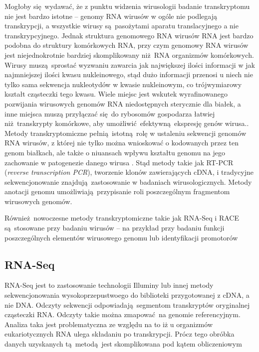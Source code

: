 \documentclass[two column, twoside, a4paper]{article}
\begin{document}
 Mogłoby się wydawać, że z punktu widzenia wirusologii badanie transkryptomu nie jest bardzo istotne -- genomy RNA wirusów w ogóle nie podlegają transkrypcji, a wszystkie wirusy są pasożytami aparatu translacyjnego a nie transkrypcyjnego. Jednak struktura genomowego RNA wirusów RNA jest bardzo podobna do struktury komórkowych RNA, przy czym genomowy RNA wirusów jest niejednokrotnie bardziej skomplikowany niż RNA organizmów komórkowych. Wirusy muszą sprostać wyzwaniu zawarcia jak największej ilości informacji w jak najmniejszej ilości kwasu nukleinowego, stąd dużo informacji przenosi u niech nie tylko sama sekwencja nukleotydów w kwasie nukleinowym, co trójwymiarowy kształt cząsteczki tego kwasu. Wiele miejsc jest wskutek wyrafinowanego pozwijania wirusowych genomów RNA niedostępnych sterycznie dla białek, a inne miejsca muszą przyłączać się do rybosomów gospodarza łatwiej niż transkrypty komórkowe, aby umożliwić efektywną ekspresję genów wirusa.. Metody transkryptomiczne pełnią istotną rolę w ustaleniu sekwencji genomów RNA wirusów, z której nie tylko można wnioskować o kodowanych przez ten genom białkach, ale także o niuansach wpływu kształtu genomu na jego zachowanie w patogenezie danego wirusa \autocite{Piekarowicz2013}. Stąd metody takie jak RT-PCR (\textit{reverse transcription PCR}), tworzenie klonów zawierających cDNA, i tradycyjne sekwencjonowanie znajdują zastosowanie w badaniach wirusologicznych. Metody anotacji genomu umożliwiają przypisanie roli poszczególnym fragmentom wirusowych genomów.

Również nowoczesne metody transkryptomiczne takie jak RNA-Seq i RACE są stosowane przy badaniu wirusów -- na przykład przy badaniu funkcji poszczególnych elementów wirusowego genomu lub identyfikacji promotorów \autocite{Steger2001}

\subsection{RNA-Seq}

RNA-Seq jest to zastosowanie technologii Illuminy lub innej metody sekwencjonowania wysokoprzepustwoego do biblioteki przygotowanej z cDNA, a nie DNA. Odczyty sekwencji odpowiadają segmentom transkryptów oryginalnej cząsteczki RNA. Odczyty takie można zmapować na genomie referencyjnym. Analiza taka jest problematyczna ze względu na to iż u organizmów eukariotycznych RNA ulega składaniu po transkrypcji. Prócz tego obróbka danych uzyskanych tą metodą jest skomplikowana pod kątem obliczeniowym \autocite{Brown2019}
\end{document}
